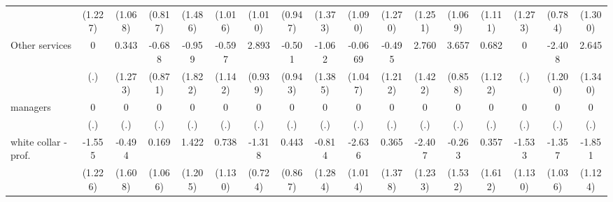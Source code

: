 {\begin{tabular}{l*{16}{c}}
                    &     (1.227)         &     (1.068)         &     (0.817)         &     (1.486)         &     (1.016)         &     (1.010)         &     (0.947)         &     (1.373)         &     (1.090)         &     (1.270)         &     (1.251)         &     (1.069)         &     (1.111)         &     (1.273)         &     (0.784)         &     (1.300)         \\
[1em]
Other services      &           0         &       0.343         &      -0.688         &      -0.959         &      -0.597         &       2.893\sym{**} &      -0.501         &      -1.062         &     -0.0669         &      -0.495         &       2.760         &       3.657\sym{***}&       0.682         &           0         &      -2.408\sym{*}  &       2.645\sym{*}  \\
                    &         (.)         &     (1.273)         &     (0.871)         &     (1.822)         &     (1.142)         &     (0.939)         &     (0.943)         &     (1.385)         &     (1.047)         &     (1.212)         &     (1.422)         &     (0.858)         &     (1.122)         &         (.)         &     (1.200)         &     (1.340)         \\
[1em]
managers            &           0         &           0         &           0         &           0         &           0         &           0         &           0         &           0         &           0         &           0         &           0         &           0         &           0         &           0         &           0         &           0         \\
                    &         (.)         &         (.)         &         (.)         &         (.)         &         (.)         &         (.)         &         (.)         &         (.)         &         (.)         &         (.)         &         (.)         &         (.)         &         (.)         &         (.)         &         (.)         &         (.)         \\
[1em]
white collar - prof.&      -1.555         &      -0.494         &       0.169         &       1.422         &       0.738         &      -1.318         &       0.443         &      -0.814         &      -2.636\sym{**} &       0.365         &      -2.407         &      -0.263         &       0.357         &      -1.533         &      -1.357         &      -1.851         \\
                    &     (1.226)         &     (1.608)         &     (1.066)         &     (1.205)         &     (1.130)         &     (0.724)         &     (0.867)         &     (1.284)         &     (1.014)         &     (1.378)         &     (1.233)         &     (1.532)         &     (1.612)         &     (1.130)         &     (1.036)         &     (1.124)         \\

\end{tabular}}
